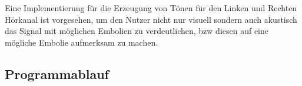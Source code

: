 Eine Implementierung für die Erzeugung von Tönen für den Linken und Rechten Hörkanal ist vorgesehen, um den Nutzer nicht nur visuell sondern auch akustisch das Signal mit möglichen Embolien zu verdeutlichen, \ac{bzw} diesen auf eine mögliche Embolie aufmerksam zu machen.
\subsection{Programmablauf}
\newpage